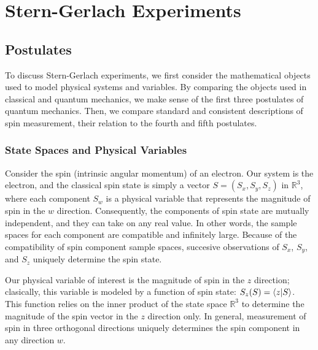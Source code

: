 \usetikzlibrary{shapes.geometric}
\usetikzlibrary{positioning}

\newcommand{\apparatus}[4]{\node[square node] (#1) at (#2,#3){#4};
                           \node[port] (#1+) at (#2 + 0.375, #3 + 0.5){+};
                           \node[port] (#1-) at (#2 + 0.375, #3 - 0.5){-};}

\part{Stern-Gerlach Experiments}

\chapter{Postulates}

To discuss Stern-Gerlach experiments, we first consider the mathematical objects used to model physical systems and variables. By comparing the objects used in classical and quantum mechanics, we make sense of the first three postulates of quantum mechanics. Then, we compare standard and consistent descriptions of spin measurement, their relation to the fourth and fifth postulates.

\section{State Spaces and Physical Variables}
Consider the spin (intrinsic angular momentum) of an electron. Our system is the electron, and the classical spin state is simply a vector $S = (S_x, S_y, S_z)$ in $\mathbb{R}^3$, where each component $S_w$ is a physical variable that represents the magnitude of spin in the $w$ direction. Consequently, the components of spin state are mutually independent, and they can take on any real value. In other words, the sample spaces for each component are compatible and infinitely large. Because of the compatibility of spin component sample spaces, succesive observations of $S_x$, $S_y$, and $S_z$ uniquely determine the spin state.

Our physical variable of interest is the magnitude of spin in the $z$ direction; clasically, this variable is modeled by a function of spin state: $S_z(S) = \braket{z|S}$. This function relies on the inner product of the state space $\mathbb{R}^3$ to determine the magnitude of the spin vector in the $z$ direction only. In general, measurement of spin in three orthogonal directions uniquely determines the spin component in any direction $w$.

